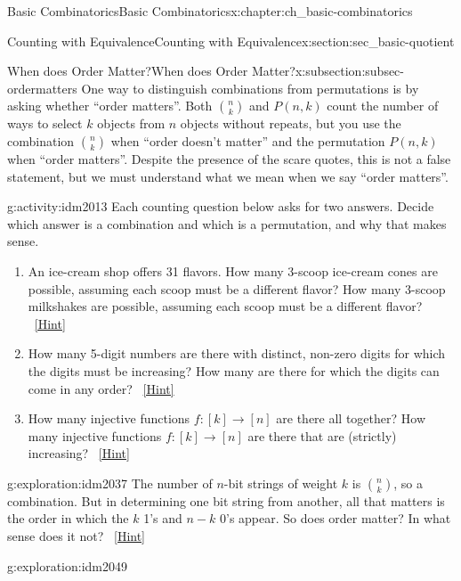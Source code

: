 \documentclass[oneside,10pt,]{book}
\numberwithin{equation}{chapter}
\begin{document}
\begin{chapterptx}{Basic Combinatorics}{}{Basic Combinatorics}{}{}{x:chapter:ch_basic-combinatorics}
\begin{sectionptx}{Counting with Equivalence}{}{Counting with Equivalence}{}{}{x:section:sec_basic-quotient}
%
%
\typeout{************************************************}
\typeout{************************************************}
%
\begin{subsectionptx}{When does Order Matter?}{}{When does Order Matter?}{}{}{x:subsection:subsec-ordermatters}
One way to distinguish combinations from permutations is by asking whether ``order matters''.  Both \(\binom{n}{k}\) and \(P(n,k)\) count the number of ways to select \(k\) objects from \(n\) objects without repeats, but you use the combination \(\binom{n}{k}\) when ``order doesn't matter'' and the permutation \(P(n,k)\) when ``order matters''.  Despite the presence of the scare quotes, this is not a false statement, but we must understand what we mean when we say ``order matters''.%
\begin{activity}{}{g:activity:idm2013}%
Each counting question below asks for two answers.  Decide which answer is a combination and which is a permutation, and why that makes sense.%
\begin{enumerate}[font=\bfseries,label=(\alph*),ref=\alph*]
\item{}An ice-cream shop offers 31 flavors.  How many 3-scoop ice-cream cones are possible, assuming each scoop must be a different flavor?  How many 3-scoop milkshakes are possible, assuming each scoop must be a different flavor?%
\qquad~\hfill{\tiny\hyperlink{g:hint:idm2019-back}{[Hint]}}\item{}How many 5-digit numbers are there with distinct, non-zero digits for which the digits must be increasing?  How many are there for which the digits can come in any order?%
\qquad~\hfill{\tiny\hyperlink{g:hint:idm2024-back}{[Hint]}}\item{}How many injective functions \(f:[k] \to [n]\) are there all   together?  How many injective functions \(f:[k] \to [n]\) are there that are (strictly) increasing?%
\qquad~\hfill{\tiny\hyperlink{g:hint:idm2034-back}{[Hint]}}\end{enumerate}
\end{activity}
\begin{exploration}{}{g:exploration:idm2037}%
The number of \(n\)-bit strings of weight \(k\) is \(\binom{n}{k}\), so a combination.  But in determining one bit string from another, all that matters is the order in which the \(k\) 1's and \(n-k\) 0's appear.  So does order matter?  In what sense does it not?%
\qquad~\hfill{\tiny\hyperlink{g:hint:idm2045-back}{[Hint]}}\end{exploration}
\begin{exploration}{}{g:exploration:idm2049}%

\end{exploration}
\end{subsectionptx}
\end{sectionptx}
\end{chapterptx}
\end{document}
